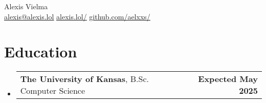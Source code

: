 \documentclass[letter,11pt]{article}
\makeatletter
\newcommand{\resumeSubheading}[3]{
	\vspace{-2pt}\item
	\begin{tabular*}{1.0\textwidth}[t]{l@{\extracolsep{\fill}}r}
		\textbf{#1}, {\small #2} & \textbf{\small #3} \\
	\end{tabular*}\vspace{-5pt}
}
\newcommand{\resumeSubHeadingListStart}{\begin{itemize}[leftmargin=0.0in, label={}]}
\newcommand{\resumeSubHeadingListEnd}{\end{itemize}}
\makeatother
\begin{document}
\begin{center}
    {\huge Alexis Vielma} \\
    \vspace{5pt}
    \href{mailto:alexis@alexis.lol}{\underline{alexis@alexis.lol}} \hspace{10pt}
    \href{https://alexis.lol/}{\underline{alexis.lol/}} \hspace{10pt}
    \href{https://github.com/aelxxs/}{\underline{github.com/aelxxs/}}
    \vspace{-5pt}
\end{center}

\section{Education}
	\resumeSubHeadingListStart
		\resumeSubheading{The University of Kansas}{B.Sc. Computer Science}{Expected May 2025}
	\resumeSubHeadingListEnd

\end{document}
